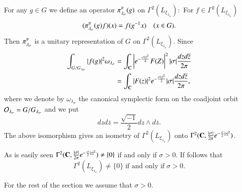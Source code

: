 For any $g \in G$ we define an operator $\pi_{\lambda_{\sigma}}^{\mathfrak{p}}(g)$ on $\Gamma^{2}(L_{\xi_{\lambda_{\sigma}}}):$ For $f \in \Gamma^{2}(L_{\xi_{\lambda_{\sigma}}})$
$$
(\pi_{\lambda_{\sigma}}^{\mathfrak{p}}(g)f)(x)=f(g^{-1}x) \quad (x \in G).
$$
Then $ \pi_{\lambda_{\sigma}}^{\mathfrak{p}}$ is a unitary representation of $G$ on $\Gamma^{2}(L_{\xi_{\lambda_{\sigma}}})$.  Since
\begin{align*}
\int_{G/G_{\lambda_{\sigma}}}|f(g)|^{2}\omega_{\lambda_{\sigma}} &= \int_{\mathbf{C}}\left| e^{-\frac{\sigma|z|^{2}}{4}}F(Z)\right|^{2} |\sigma| \dfrac{dzd\overline{z}}{2\pi}\\
&= \int_{\mathbf{C}}|F(z)|^{2} e^{-\frac{\sigma |z|^{2}}{2}}|\sigma| \dfrac{dzd\overline{z}}{2\pi},
\end{align*}
where we denote by $\omega_{\lambda_{\sigma}}$ the canonical symplectic form on the coadjoint orbit $\mathcal{O}_{\lambda_{\sigma}}= G/G_{\lambda_{\sigma}}$ and we put
$$
dzd\overline{z}= \dfrac{\sqrt{-1}}{2}dz \wedge d\overline{z}.
$$
The above isomorphism gives an isometry of $\Gamma^{2}(L_{\xi_{\lambda_{\sigma}}})$ onto $\Gamma^{2}(\mathbf{C}, \frac{|\sigma|}{2 \pi}e^{-\frac{\sigma}{2}|z|^{2}})$.

As is easily seen $\Gamma^{2}(\mathbf{C}, \frac{|\sigma|}{2\pi}e^{-\frac{\sigma}{2}|z|^{2}}) \neq \{0\}$ if and only if $\sigma > 0$. If follows that
$$
\Gamma^{2}(L_{\xi_{\lambda_{\sigma}}})\neq \{0\}\; \text{if and only if}\; \sigma > 0.
$$

For the rest of the section we assume that  $\sigma > 0$.

